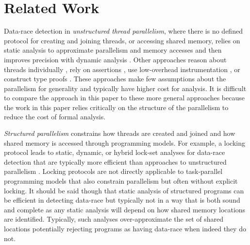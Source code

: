 \section{Related Work} \label{sec:rel-work}
Data-race detection in \emph{unstructured thread parallelism}, where there is no defined protocol for creating and joining threads, or accessing shared memory, relies on static analysis to approximate parallelism and memory accesses \cite{schonberg1989fly,choi2001static,kahlon2009static,kulikov2010detecting,vechev2011automatic} and then improves precision with dynamic analysis \cite{lamport1978time,Godefroid,flanagan2009fasttrack,EraserUpgrade,dimitrov2014commutativity}. Other approaches reason about threads individually \cite{xu1997rely,flanagan2003thread,henzinger2003thread,malkis2007precise,gotsman2007thread}, rely on  assertions \cite{burnim2009asserting, burnim2010determin, hong2012testing, yu2012maple, terragni2015recontest, yu2014simrt, leon2015unfolding, kahkonen2015unfolding}, use low-overhead instrumentation \cite{nistor2010instantcheck}, or construct type proofs \cite{abadi2006types}. These approaches  make few assumptions about the parallelism for generality and typically have higher cost for analysis. It is difficult to compare the approach in this paper to these more general approaches because the work in this paper relies critically on the structure of the parallelism to reduce the cost of formal analysis. 

\emph{Structured parallelism} constrains how threads are created and joined and how shared memory is accessed through programming models. For example, a locking protocol leads to static, dynamic, or hybrid lock-set analyses for data-race detection that are typically more efficient than approaches to unstructured parallelism \cite{savage1997eraser,engler2003racerx,locksets-msr,elmas2006goldilocks,naik2006effective,elmas2007goldilocks,voung2007relay,kahlon2010universal}. Locking protocols are not directly applicable to task-parallel programming models that also constrain parallelism but often without explicit locking. It should be said though that static analysis of structured programs can be efficient in detecting data-race but typically not in a way that is both sound and complete as any static analysis will depend on how shared memory locations are identified. Typically, such analyses over-approximate the set of shared locations potentially rejecting programs as having data-race when indeed they do not. 


